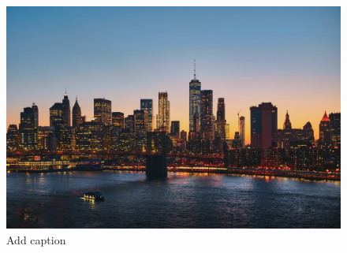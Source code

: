 \documentclass{article}
\begin{document}
\begin{figure}[H]
  \centering
  \includegraphics[width=\textwidth]{filler.png} 
  \caption{Add caption}
  \label{fig:example}
\end{figure}
\end{document}
